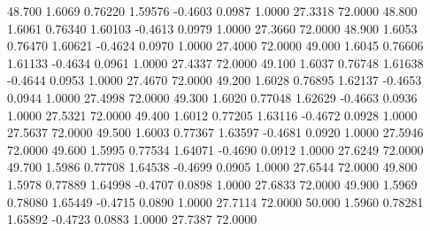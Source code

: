   48.700   1.6069   0.76220   1.59576  -0.4603   0.0987   1.0000  27.3318  72.0000
  48.800   1.6061   0.76340   1.60103  -0.4613   0.0979   1.0000  27.3660  72.0000
  48.900   1.6053   0.76470   1.60621  -0.4624   0.0970   1.0000  27.4000  72.0000
  49.000   1.6045   0.76606   1.61133  -0.4634   0.0961   1.0000  27.4337  72.0000
  49.100   1.6037   0.76748   1.61638  -0.4644   0.0953   1.0000  27.4670  72.0000
  49.200   1.6028   0.76895   1.62137  -0.4653   0.0944   1.0000  27.4998  72.0000
  49.300   1.6020   0.77048   1.62629  -0.4663   0.0936   1.0000  27.5321  72.0000
  49.400   1.6012   0.77205   1.63116  -0.4672   0.0928   1.0000  27.5637  72.0000
  49.500   1.6003   0.77367   1.63597  -0.4681   0.0920   1.0000  27.5946  72.0000
  49.600   1.5995   0.77534   1.64071  -0.4690   0.0912   1.0000  27.6249  72.0000
  49.700   1.5986   0.77708   1.64538  -0.4699   0.0905   1.0000  27.6544  72.0000
  49.800   1.5978   0.77889   1.64998  -0.4707   0.0898   1.0000  27.6833  72.0000
  49.900   1.5969   0.78080   1.65449  -0.4715   0.0890   1.0000  27.7114  72.0000
  50.000   1.5960   0.78281   1.65892  -0.4723   0.0883   1.0000  27.7387  72.0000
